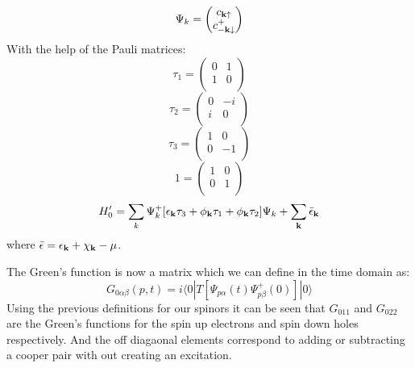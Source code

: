 \documentclass{article}
\def\k{{\bf k}}
\def\bra{\langle}
\def\ket{\rangle}
\def\ck{c_{\k\uparrow}}
\def\cmkp{c^{+}_{-\k\downarrow}}
\begin{document}
\begin{equation}
\Psi_{k} = 
\begin{pmatrix}
\ck \\
\cmkp
\end{pmatrix}
\end{equation}
%
With the help of the Pauli matrices:
%
\begin{equation}
\tau_{1} =  
\begin{pmatrix}
0 & 1 \\
1 & 0 \\
\end{pmatrix}
\end{equation}
%
\begin{equation}
\tau_{2} =  
\begin{pmatrix}
0 & -i \\
i & 0  \\
\end{pmatrix}
\end{equation}
%
\begin{equation}
\tau_{3} =  
\begin{pmatrix}
1 & 0  \\
0 & -1 \\
\end{pmatrix}
\end{equation}
%
\begin{equation}
1 =  
\begin{pmatrix}
1 & 0 \\
0 & 1 \\
\end{pmatrix}
\end{equation}
%
\begin{equation}
H'_{0} = \sum_{k} \Psi^{+}_{k}[\epsilon_{\k} \tau_{3} + \phi_{\k}\tau_{1} + \phi_{\k}\tau_{2}]\Psi_{k} + \sum_{\k} \bar{\epsilon}_{\k}
\end{equation}
%
where $\bar{\epsilon} = \epsilon_{\k} + \chi_{\k} - \mu$.

The Green's function is now a matrix which we can define in the time domain as:
%
\begin{equation}
\label{eq:nambugrn}
G_{0\alpha\beta}(p,t) =  i\bra 0 |T[\Psi_{p\alpha}(t)\Psi^{+}_{p\beta}(0) ]|0\ket 
\end{equation}
%
Using the previous definitions for our spinors it can be seen that $G_{011}$ and $G_{022}$ are the Green's
functions for the spin up electrons and spin down holes respectively. And the off diagaonal elements
correspond to adding or subtracting a cooper pair with out creating an excitation.
%
%
\end{document}
